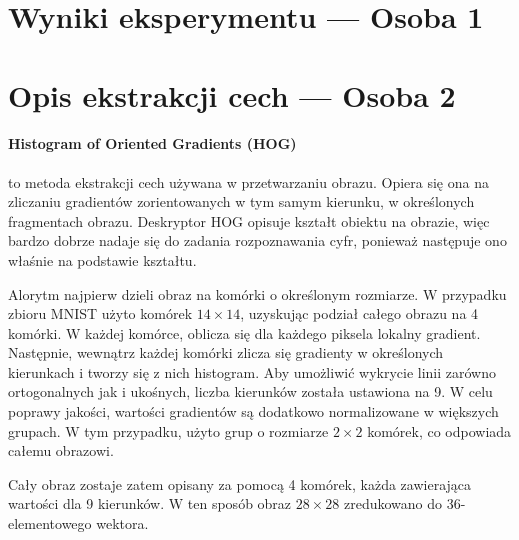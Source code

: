 \documentclass[10pt]{article}
\begin{document}
\pagebreak

\section{Wyniki eksperymentu --- Osoba 1}
\pagebreak

\section{Opis ekstrakcji cech --- Osoba 2}

\paragraph{Histogram of Oriented Gradients (HOG)} to metoda ekstrakcji cech używana w przetwarzaniu obrazu.
Opiera się ona na zliczaniu gradientów zorientowanych w tym samym kierunku, w określonych fragmentach obrazu.
Deskryptor HOG opisuje kształt obiektu na obrazie, więc bardzo dobrze nadaje się do zadania rozpoznawania cyfr, ponieważ następuje ono właśnie na podstawie kształtu.

Alorytm najpierw dzieli obraz na komórki o określonym rozmiarze. W przypadku zbioru MNIST użyto komórek $14\times14$, uzyskując podział całego obrazu na 4 komórki.
W każdej komórce, oblicza się dla każdego piksela lokalny gradient.
Następnie, wewnątrz każdej komórki zlicza się gradienty w określonych kierunkach i tworzy się z nich histogram.
Aby umożliwić wykrycie linii zarówno ortogonalnych jak i ukośnych, liczba kierunków została ustawiona na 9.
W celu poprawy jakości, wartości gradientów są dodatkowo normalizowane w większych grupach.
W tym przypadku, użyto grup o rozmiarze $2\times2$ komórek, co odpowiada całemu obrazowi.

Cały obraz zostaje zatem opisany za pomocą 4 komórek, każda zawierająca wartości dla 9 kierunków.
W ten sposób obraz $28\times28$ zredukowano do 36-elementowego wektora.
\end{document}
